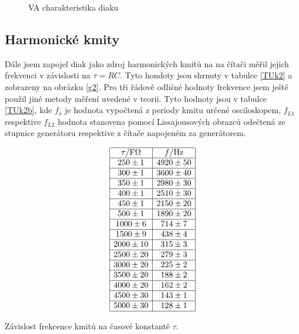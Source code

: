 \documentclass[a4paper,12pt]{article}
\begin{document}
    \begin{figure}
    
    \caption{VA charakteristika diaku}
    \label{g1}
    \end{figure}

\subsection{Harmonické kmity}
    Dále jsem zapojel diak jako zdroj harmonických kmitů na na čítači měřil jejich frekvenci v závislosti na $\tau = RC$. Tyto hondoty jsou shrnuty 
    v tabulce \ref{TUk2} a zobrazeny na obrázku \ref{g2}. Pro tři řádově odlišné hodnoty frekvence jsem ještě použil jiné metody měření uvedené v teorii. 
    Tyto hodnoty jsou v tabulce \ref{TUk2b}, kde $f_o$ je hodnota vypočtená z periody kmitu určené osciloskopem, $f_{L1}$ respektive $f_{L2}$ hodnota stanovena pomocí Lissajousových 
    obrazců odečtená ze stupnice generátoru respektive z čítače napojeném za generátorem.
    
    \begin{table}
    $$
    \begin{array}{|c|c|}
    \hline
    \tau/\mbox{F}\Omega&    f/\mbox{Hz} \\ \hline
    250\pm1&    4920\pm50 \\ \hline
    300\pm1&    3600\pm40 \\ \hline
    350\pm1&    2980\pm30 \\ \hline
    400\pm1&    2510\pm30 \\ \hline
    450\pm1&    2150\pm20 \\ \hline
    500\pm1&    1890\pm20 \\ \hline
    1000\pm6&   714\pm7 \\ \hline
    1500\pm9&   438\pm4 \\ \hline
    2000\pm10&   315\pm3 \\ \hline
    2500\pm20&   279\pm3 \\ \hline
    3000\pm20&   225\pm2 \\ \hline
    3500\pm20&   188\pm2 \\ \hline
    4000\pm20&   162\pm2 \\ \hline
    4500\pm30&   143\pm1 \\ \hline
    5000\pm30&   128\pm1 \\ \hline
    \end{array}
    $$
    \caption{Závislost frekcence kmitů na časové konstantě $\tau$.}
    \label{TUk2}
    \end{table}
\end{document}
